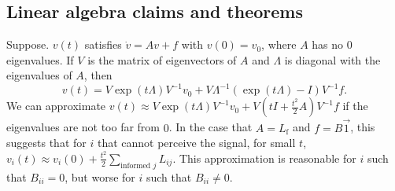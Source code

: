\documentclass{article}
\begin{document}
\subsection{Linear algebra claims and theorems }

\begin{claim} 
\label{exp_approx}
Suppose. $v(t)$ satisfies $\dot{v}=Av+f$ with $v(0)=v_0$, where $A$ has no $0$ eigenvalues. If $V$ is the matrix of eigenvectors of $A$ and $\Lambda$ is diagonal with the eigenvalues of $A$, then
\begin{equation} \label{diffeq_solution}
v(t)=V\exp(t\Lambda)V^{-1}v_0+V\Lambda^{-1}(\exp(t\Lambda)-I)V^{-1}f.
\end{equation}
We can approximate $v(t)\approx V\exp(t\Lambda)V^{-1}v_0+V(tI+\frac{t^2}{2}A)V^{-1}f$ if the eigenvalues are not too far from $0$. In the case that $A=L_\text{f}$ and $f=B\vec{1}$, this suggests that for $i$ that cannot perceive the signal,  for small $t$, $v_i(t)\approx v_i(0)+\frac{t^2}{2}\sum_{\text{informed }j }L_{ij}.$ This approximation is reasonable for $i$ such that $B_{ii}=0$, but worse for $i$ such that $B_{ii}\neq 0$. 
\end{claim}
\end{document}
